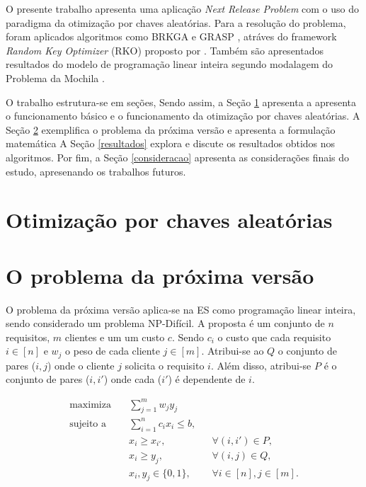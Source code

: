 \documentclass[12pt]{article}
\begin{document}
    O presente trabalho apresenta uma aplicação \textit{Next Release Problem} com o uso do paradigma da otimização por chaves aleatórias. Para a resolução do problema, foram aplicados algoritmos como BRKGA \cite{resende2010brkga} e GRASP \cite{chaves2024randomkey}, atráves do framework \textit{Random Key Optimizer} 
     (RKO) proposto por \cite{chaves2024rko}. Também são apresentados resultados do modelo de programação linear inteira segundo modalagem do Problema da Mochila \cite{salkin1975knapsack}.

    O trabalho estrutura-se em seções, Sendo assim, a Seção \ref{rko} apresenta a apresenta o funcionamento básico e o funcionamento da otimização por chaves aleatórias. A Seção \ref{problema} exemplifica o problema da próxima versão e apresenta a formulação matemática  A Seção \ref{resultados} explora e discute os resultados obtidos nos algoritmos. Por fim, a Seção \ref{consideracao} apresenta as considerações finais do estudo, apresenando os trabalhos futuros. 


\section{Otimização por chaves aleatórias} \label{rko}

    

\section{O problema da próxima versão} \label{problema}


    O problema da próxima versão aplica-se na ES como programação linear inteira, sendo considerado um problema NP-Difícil. A proposta é um conjunto de $n$ requisitos, $m$ clientes e um um custo $c$. Sendo $c_i$ o custo que cada requisito $i \in  [n]$ e  $w_j$ o peso de cada cliente $j \in [m]$. Atribui-se ao $Q$ o conjunto de pares ($i, j$) onde o cliente $j$ solicita o requisito $i$. Além disso, atribui-se $P$ é o conjunto de pares ($i, i'$) onde cada ($i'$) é dependente de $i$. 


     \begin{align*}
        \text{maximiza} \quad & \sum_{j=1}^{m} w_j y_j \\
        \text{sujeito a} \quad & \sum_{i=1}^{n} c_i x_i \leq b, \\
        & x_i \geq x_{i'},       && \forall (i, i') \in P, \\
        & x_i \geq y_j,          && \forall (i, j) \in Q, \\
        & x_i, y_j \in \{0,1\},  && \forall i \in [n], j \in [m].
    \end{align*}
\end{document}
